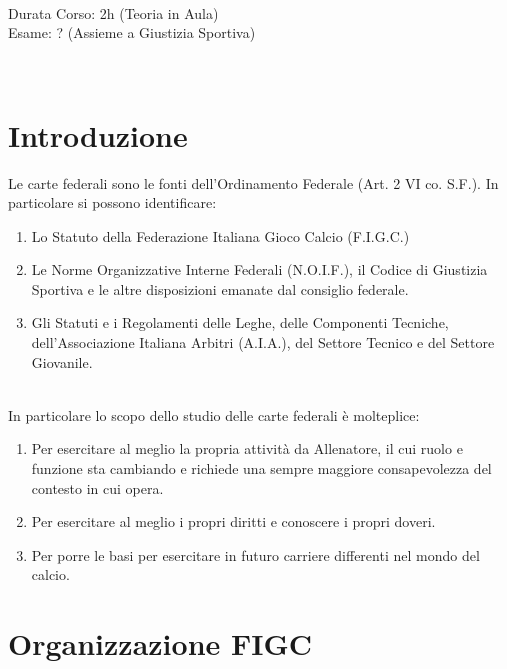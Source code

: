 \documentclass[../uefaC.tex]{subfiles}
\begin{document}

\hfill \\
Durata Corso: 2h (Teoria in Aula) \hfill \\
Esame: ? (Assieme a Giustizia Sportiva)

\hfill \\
\section{Introduzione}
Le carte federali sono le fonti dell'Ordinamento Federale (Art. 2 VI co. S.F.). In particolare si possono identificare:
\begin{enumerate}
    \item Lo Statuto della Federazione Italiana Gioco Calcio (F.I.G.C.)
    \item Le Norme Organizzative Interne Federali (N.O.I.F.), il Codice di Giustizia Sportiva e le altre disposizioni emanate dal consiglio federale.
    \item Gli Statuti e i Regolamenti delle Leghe, delle Componenti Tecniche, dell'Associazione Italiana Arbitri (A.I.A.), del Settore Tecnico e del Settore Giovanile.
\end{enumerate}
\hfill \\
In particolare lo scopo dello studio delle carte federali è molteplice:
\begin{enumerate}
    \item Per esercitare al meglio la propria attività da Allenatore, il cui ruolo e funzione sta cambiando e richiede una sempre maggiore consapevolezza del contesto in cui opera.
    \item Per esercitare al meglio i propri diritti e conoscere i propri doveri.
    \item Per porre le basi per esercitare in futuro carriere differenti nel mondo del calcio.
\end{enumerate}

\section{Organizzazione FIGC}
\end{document}
